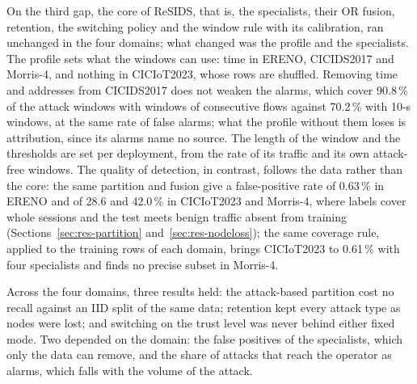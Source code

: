 On the third gap, the core of ReSIDS, that is, the specialists, their OR fusion, retention, the switching policy and the window rule with its calibration, ran unchanged in the four domains; what changed was the profile and the specialists. The profile sets what the windows can use: time in ERENO, CICIDS2017 and Morris-4, and nothing in CICIoT2023, whose rows are shuffled. Removing time and addresses from CICIDS2017 does not weaken the alarms, which cover 90.8\,\% of the attack windows with windows of consecutive flows against 70.2\,\% with 10-s windows, at the same rate of false alarms; what the profile without them loses is attribution, since its alarms name no source. The length of the window and the thresholds are set per deployment, from the rate of its traffic and its own attack-free windows. The quality of detection, in contrast, follows the data rather than the core: the same partition and fusion give a false-positive rate of 0.63\,\% in ERENO and of 28.6 and 42.0\,\% in CICIoT2023 and Morris-4, where labels cover whole sessions and the test meets benign traffic absent from training (Sections~\ref{sec:res-partition} and~\ref{sec:res-nodeloss}); the same coverage rule, applied to the training rows of each domain, brings CICIoT2023 to 0.61\,\% with four specialists and finds no precise subset in Morris-4.

Across the four domains, three results held: the attack-based partition cost no recall against an IID split of the same data; retention kept every attack type as nodes were lost; and switching on the trust level was never behind either fixed mode. Two depended on the domain: the false positives of the specialists, which only the data can remove, and the share of attacks that reach the operator as alarms, which falls with the volume of the attack.
